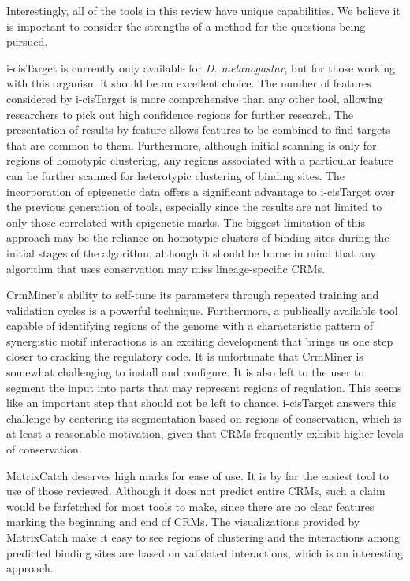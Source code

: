 \documentclass{frontiersENG} %
\begin{document}
Interestingly, all of the tools in this review have unique
capabilities. We believe it is important to consider the strengths of
a method for the questions being pursued.

i-cisTarget is currently only available for \textit{D. melanogastar},
but for those working with this organism it should be an excellent
choice. The number of features considered by i-cisTarget is more
comprehensive than any other tool, allowing researchers to pick out
high confidence regions for further research. The presentation of
results by feature allows features to be combined to find targets that
are common to them. Furthermore, although initial scanning is only for
regions of homotypic clustering, any regions associated with a
particular feature can be further scanned for heterotypic clustering
of binding sites. The incorporation of epigenetic data offers a
significant advantage to i-cisTarget over the previous generation of
tools, especially since the results are not limited to only those
correlated with epigenetic marks. The biggest limitation of this
approach may be the reliance on homotypic clusters of binding sites
during the initial stages of the algorithm, although it should be
borne in mind that any algorithm that uses conservation may miss
lineage-specific CRMs.

CrmMiner's ability to self-tune its parameters through repeated
training and validation cycles is a powerful technique. Furthermore, a
publically available tool capable of identifying regions of the genome
with a characteristic pattern of synergistic motif interactions is an
exciting development that brings us one step closer to cracking the
regulatory code. It is unfortunate that CrmMiner is somewhat
challenging to install and configure. It is also left to the user to
segment the input into parts that may represent regions of
regulation. This seems like an important step that should not be left
to chance. i-cisTarget answers this challenge by centering its
segmentation based on regions of conservation, which is at least a
reasonable motivation, given that CRMs frequently exhibit higher
levels of conservation.

MatrixCatch deserves high marks for ease of use. It is by far the
easiest tool to use of those reviewed. Although it does not predict
entire CRMs, such a claim would be farfetched for most tools to make,
since there are no clear features marking the beginning and end of
CRMs. The visualizations provided by MatrixCatch make it easy to see
regions of clustering and the interactions among predicted binding
sites are based on validated interactions, which is an interesting
approach.
\end{document}
